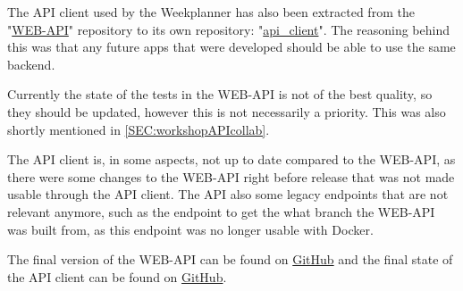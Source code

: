 The API client used by the Weekplanner has also been extracted from the "\href{https://github.com/aau-giraf/web-api/tree/2019S4R1}{WEB-API}" repository to its own repository: "\href{https://github.com/aau-giraf/api_client/tree/2019S4R1}{api\_client}".
The reasoning behind this was that any future apps that were developed should be able to use the same backend.

Currently the state of the tests in the WEB-API is not of the best quality, so they should be updated, however this is not necessarily a priority.
This was also shortly mentioned in \autoref{SEC:workshopAPIcollab}.

The API client is, in some aspects, not up to date compared to the WEB-API, as there were some changes to the WEB-API right before release that was not made usable through the API client.
The API also some legacy endpoints that are not relevant anymore, such as the endpoint to get the what branch the WEB-API was built from, as this endpoint was no longer usable with Docker.


The final version of the WEB-API can be found on \href{https://github.com/aau-giraf/web-api/tree/2019S4R1}{GitHub} and the final state of the API client can be found on \href{https://github.com/aau-giraf/api_client/tree/2019S4R1}{GitHub}.


